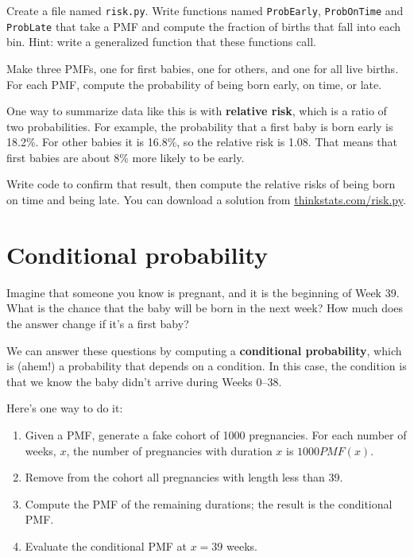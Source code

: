 \documentclass[12pt]{book}
\begin{document}

\begin{exercise}
Create a file named {\tt risk.py}.
Write functions named {\tt ProbEarly}, {\tt ProbOnTime} and
{\tt ProbLate} that take a PMF and compute the fraction of births
that fall into each bin.  Hint: write a generalized function
that these functions call.

Make three PMFs, one for first babies, one for others, and one for
all live births.  For each PMF, compute the probability of being
born early, on time, or late.

One way to summarize data like this is with {\bf relative risk},
which is a ratio of two probabilities.  For example, the probability
that a first baby is born early is 18.2\%.  For other babies it is
16.8\%, so the relative risk is 1.08.  That means that first babies
are about 8\% more likely to be early.

Write code to confirm that result, then compute the relative risks of
being born on time and being late.  You can download a solution
from \url{thinkstats.com/risk.py}.

\end{exercise}


\section{Conditional probability}

Imagine that someone you know is pregnant, and it is the beginning of
Week 39.  What is the chance that the baby will be born in the next
week?  How much does the answer change if it's a first baby?

We can answer these questions by computing a {\bf conditional
probability}, which is (ahem!) a probability that depends on a condition.
In this case, the condition is that we know the baby didn't arrive
during Weeks 0--38.

Here's one way to do it:

\begin{enumerate}


\item Given a PMF, generate a fake cohort of 1000 pregnancies.
For each number of weeks, $x$, the number of pregnancies with
duration $x$ is $1000 PMF(x)$.

\item Remove from the cohort all pregnancies with length less than 39.


\item Compute the PMF of the remaining durations; the result is the
conditional PMF.

\item Evaluate the conditional PMF at $x = 39$ weeks.

\end{enumerate}
\end{document}

